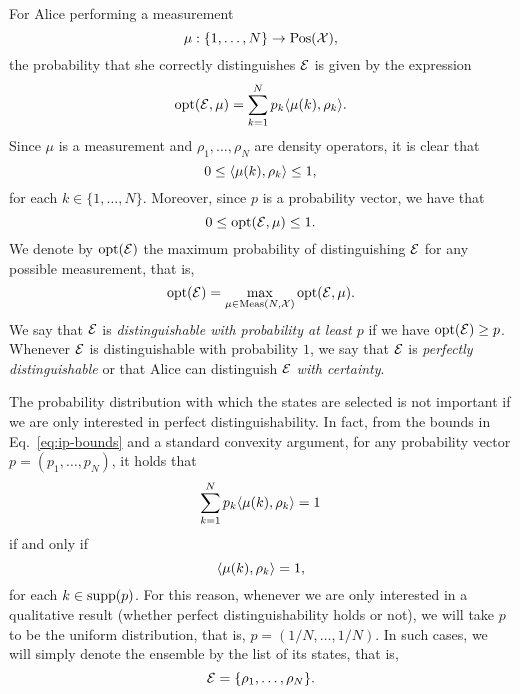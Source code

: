 For Alice performing a measurement
\begin{equation}
\label{eq:global-measurement}
\mu : \{1, \ldots, N\} \rightarrow \mathrm{Pos}(\mathcal{X}),
\end{equation}
 the probability that she correctly distinguishes $\mathcal{E}$ is given by the expression
\begin{equation}
\label{eq:opt-value-fixed-measurement}
    \operatorname{opt}(\mathcal{E}, \mu) = \sum_{k=1}^{N}p_{k}\langle \mu(k) , \rho_{k}\rangle.
\end{equation}
Since $\mu$ is a measurement and $\rho_{1}, \ldots, \rho_{N}$ are density 
operators, it is clear that 
\begin{equation}
\label{eq:ip-bounds}
  0 \leq \langle \mu(k) , \rho_{k}\rangle \leq 1,
\end{equation}
for each $k \in \{1, \ldots, N \}$.
Moreover, since $p$ is a probability vector, we have that
\begin{equation}
  0 \leq \operatorname{opt}(\mathcal{E}, \mu) \leq 1.
\end{equation}
We denote by $\operatorname{opt}(\mathcal{E})$ the maximum probability of distinguishing $\mathcal{E}$ for any 
possible measurement, that is,
\begin{equation}
\label{eq:opt-value}
    \operatorname{opt}(\mathcal{E}) = \max_{\mu\in\mathrm{Meas}(N, \mathcal{X})}\operatorname{opt}(\mathcal{E}, \mu).
\end{equation}
We say that $\mathcal{E}$ is \emph{distinguishable with probability at least $p$} if we 
have $\operatorname{opt}(\mathcal{E}) \geq p$. Whenever $\mathcal{E}$ is distinguishable with probability $1$, we say
that $\mathcal{E}$ is \emph{perfectly distinguishable} or that Alice can distinguish
$\mathcal{E}$ \emph{with certainty}.

The probability distribution with which the states are selected is not important 
if we are only interested in perfect distinguishability.
In fact, from the bounds in Eq.~\eqref{eq:ip-bounds} and a standard convexity argument,
for any probability vector $p = (p_{1}, \ldots, p_{N})$, it holds that
\begin{equation}
  \sum_{k=1}^{N}p_{k}\langle \mu(k) , \rho_{k}\rangle = 1
\end{equation}
if and only if 
\begin{equation}
  \langle \mu(k) , \rho_{k}\rangle = 1,
\end{equation}
for each $k \in \operatorname{supp}(p)$.
For this reason, whenever we are only interested in a qualitative result 
(whether perfect distinguishability holds or not), we will take $p$ to be the uniform 
distribution, that is, $p = (1/N, \ldots, 1/N)$. In such cases, we will simply 
denote the ensemble by the list of its states, that is,
\begin{equation}
  \mathcal{E} = \{\rho_{1}, \ldots, \rho_{N}\}.
\end{equation}

